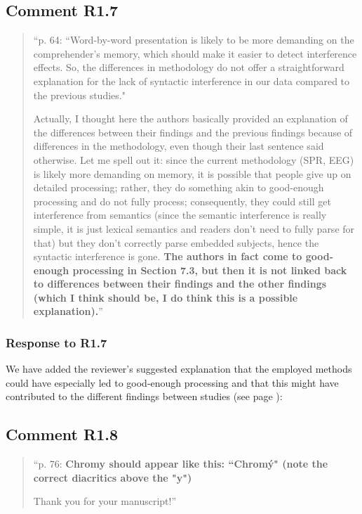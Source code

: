 \documentclass[12pt]{article}
\begin{document}
\subsection*{Comment R1.7}
\begin{quote}
``p. 64: ``Word-by-word presentation is likely to be more demanding on the comprehender's memory, which should make it easier to detect interference effects. So, the differences in methodology do not offer a straightforward
explanation for the lack of syntactic interference in our data compared to the
previous studies."

Actually, I thought here the authors basically provided an explanation of the differences between their findings and the previous findings because of differences in the methodology, even though their last sentence said otherwise. Let me spell out it: since the current methodology (SPR, EEG) is likely more demanding on memory, it is possible that people give up on detailed processing; rather, they do something akin to good-enough processing and do not fully process; consequently, they could still get interference from semantics (since the semantic interference is really simple, it is just lexical semantics and readers don't need to fully parse for that) but they don't correctly parse embedded subjects, hence the syntactic interference is gone. \textbf{The authors in fact come to good-enough processing in Section 7.3, but then it is not linked back to differences between their findings and the other findings (which I think should be, I do think this is a possible explanation).}''
\end{quote}

\subsubsection*{Response to R1.7}
We have added the reviewer's suggested explanation that the employed methods could have especially led to good-enough processing and that this might have contributed to the different findings between studies (see page \pageref{SPR_goodenough}):

\begin{quote}
\end{quote}

\subsection*{Comment R1.8}
\begin{quote}
``p. 76: \textbf{Chromy should appear like this: ``Chromý" (note the correct diacritics above the "y")}

Thank you for your manuscript!''
\end{quote}
\end{document}
